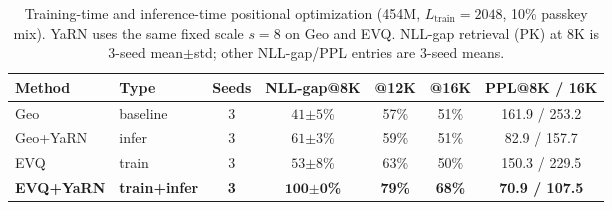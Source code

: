 \begin{table}[!h]
\caption{Training-time and inference-time positional optimization (454M, $L_{\mathrm{train}}{=}2048$, 10\% passkey mix). YaRN uses the same fixed scale $s{=}8$ on Geo and EVQ. NLL-gap retrieval (PK) at 8K is 3-seed mean$\pm$std; other NLL-gap/PPL entries are 3-seed means.}
\label{tab:evq-yarn}
\centering
\small
\setlength{\tabcolsep}{4pt}
\begin{tabular}{@{}l l c c c c c@{}}
\toprule
Method & Type & Seeds & NLL-gap@8K & @12K & @16K & PPL@8K / 16K \\
\midrule
Geo & baseline & 3 & $41{\scriptstyle\pm 5}$\% & 57\% & 51\% & 161.9 / 253.2 \\
Geo+YaRN & infer & 3 & $61{\scriptstyle\pm 3}$\% & 59\% & 51\% & 82.9 / 157.7 \\
EVQ & train & 3 & $53{\scriptstyle\pm 8}$\% & 63\% & 50\% & 150.3 / 229.5 \\
\textbf{EVQ+YaRN} & \textbf{train+infer} & \textbf{3} & $\mathbf{100{\scriptstyle\pm 0}}$\textbf{\%} & \textbf{79\%} & \textbf{68\%} & \textbf{70.9 / 107.5} \\
\bottomrule
\end{tabular}
\end{table}

